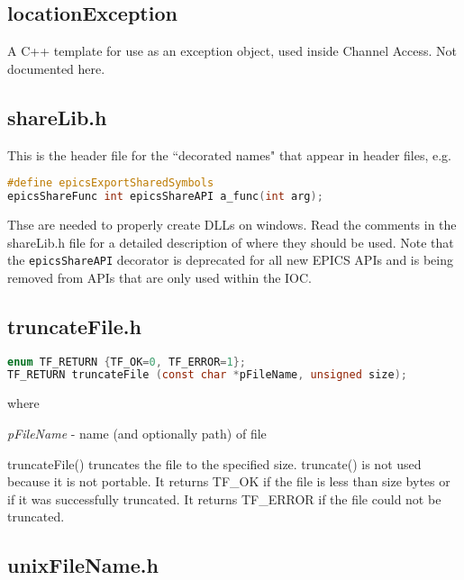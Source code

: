 \subsection{locationException}

A C++ template for use as an exception object, used inside Channel Access.
Not documented here.

\subsection{shareLib.h}

This is the header file for the ``decorated names" that appear in header files, e.g.

\begin{lstlisting}[language=C]
#define epicsExportSharedSymbols
epicsShareFunc int epicsShareAPI a_func(int arg);
\end{lstlisting}

Thse are needed to properly create DLLs on windows.
Read the comments in the shareLib.h file for a detailed description of where they should be used.
Note that the \verb|epicsShareAPI| decorator is deprecated for all new EPICS APIs and is being removed from APIs that are only used within the IOC.

\subsection{truncateFile.h}

\begin{lstlisting}[language=C]
enum TF_RETURN {TF_OK=0, TF_ERROR=1};
TF_RETURN truncateFile (const char *pFileName, unsigned size);
\end{lstlisting}

where

\begin{description}
\item \emph{pFileName} - name (and optionally path) of file

\end{description}

truncateFile() truncates the file to the specified size.
truncate() is not used because it is not portable.
It returns TF\_OK if the file is less than size bytes or if it was successfully truncated.
It returns TF\_ERROR if the file could not be truncated.

\subsection{unixFileName.h}

